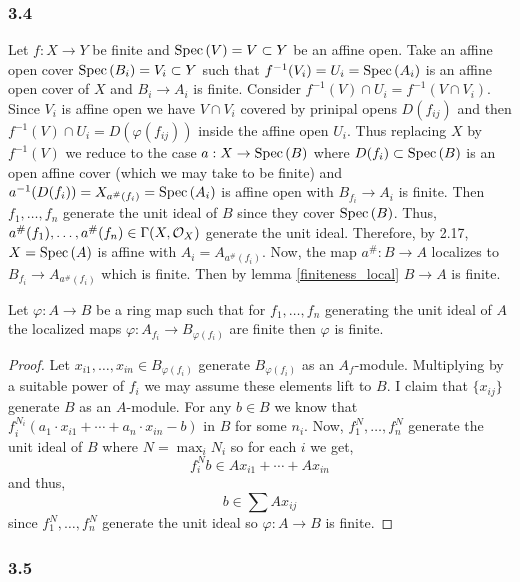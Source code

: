 \documentclass[12pt]{article}
\begin{document}
\subsubsection{3.4}

Let $f : X \to Y$ be finite and $\mathrm{Spec}\left( V \right) = V \subset Y$ be an affine open. Take an affine open cover $\mathrm{Spec}\left( B_i \right) = V_i \subset Y$ such that $f^{-1}(V_i) = U_i = \mathrm{Spec}\left( A_i \right)$ is an affine open cover of $X$ and $B_i \to A_i$ is finite. Consider $f^{-1}(V) \cap U_i = f^{-1}(V \cap V_i)$. Since $V_i$ is affine open we have $V \cap V_i$ covered by prinipal opens $D(f_{ij})$ and then $f^{-1}(V) \cap U_i = D(\varphi(f_{ij}))$ inside the affine open $U_i$. Thus replacing $X$ by $f^{-1}(V)$ we reduce to the case $a : X \to \mathrm{Spec}\left( B \right)$ where $D(f_i) \subset \mathrm{Spec}\left( B \right)$ is an open affine cover (which we may take to be finite) and $a^{-1}(D(f_i)) = X_{a^\#(f_i)} = \mathrm{Spec}\left( A_i \right)$ is affine open with $B_{f_i} \to A_i$ is finite. Then $f_1, \dots, f_n$ generate the unit ideal of $B$ since they cover $\mathrm{Spec}\left( B \right)$. Thus, $a^\#(f_1), \dots, a^\#(f_n) \in \Gamma(X, \mathcal{O}_{X})$ generate the unit ideal. Therefore, by 2.17, $X = \mathrm{Spec}\left( A \right)$ is affine with $A_i = A_{a^\#(f_i)}$. Now, the map $a^\# : B \to A$ localizes to $B_{f_i} \to A_{a^\#(f_i)}$ which is finite. Then by lemma \ref{finiteness_local} $B \to A$ is finite. 

\begin{lemma} \label{finiteness_local}
Let $\varphi : A \to B$ be a ring map such that for $f_1, \dots, f_n$ generating the unit ideal of $A$ the localized maps $\varphi : A_{f_i} \to B_{\varphi(f_i)}$ are finite then $\varphi$ is finite.
\end{lemma}

\begin{proof}
Let $x_{i1}, \dots, x_{in} \in B_{\varphi(f_i)}$ generate $B_{\varphi(f_i)}$ as an $A_f$-module. Multiplying by a suitable power of $f_i$ we may assume these elements lift to $B$. I claim that $\{ x_{ij} \}$ generate $B$ as an $A$-module. For any $b \in B$ we know that $f_i^{N_i} (a_1 \cdot x_{i1} + \cdots + a_n \cdot x_{in} - b)$ in $B$ for some $n_i$.  Now, $f_1^N, \dots, f_n^N$ generate the unit ideal of $B$ where $N = \max_i N_i$ so for each $i$ we get,
\[ f_i^N b \in A x_{i1} + \cdots + A x_{in} \]
and thus,
\[ b \in  \sum A x_{ij} \]
since $f_1^N, \dots, f_n^N$ generate the unit ideal so $\varphi : A \to B$ is finite. 
\end{proof}

\subsubsection{3.5}
\end{document}
